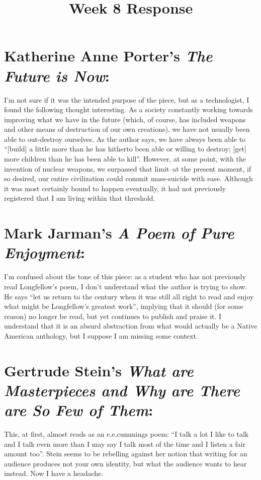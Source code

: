 \documentclass[letterpaper]{article}
\title{Week 8 Response}
\date{}
\begin{document}
	\maketitle
	\onehalfspacing
	\section{Katherine Anne Porter's \emph{The Future is Now}:}
	I'm not sure if it was the intended purpose of the piece, but as a technologist, I found the following thought interesting. As a society constantly working towards improving what we have in the future (which, of course, has included weapons and other means of destruction of our own creations), we have not usually been able to out-destroy ourselves. As the author says, we have always been able to ``[build] a little more than he has hitherto been able or willing to destroy; [get] more children than he has been able to kill''. However, at some point, with the invention of nuclear weapons, we surpassed that limit--at the present moment, if so desired, our entire civilization could commit mass-suicide with ease. Although it was most certainly bound to happen eventually, it had not previously registered that I am living within that threshold.

	\section{Mark Jarman's \emph{A Poem of Pure Enjoyment}:}
	I'm confused about the tone of this piece: as a student who has not previously read Longfellow's poem, I don't understand what the author is trying to show. He says ``let us return to the century when it was still all right to read and enjoy what might be Longfellow's greatest work'', implying that it should (for some reason) no longer be read, but yet continues to publish and praise it. I understand that it is an absurd abstraction from what would actually be a Native American anthology, but I suppose I am missing some context.

	\section{Gertrude Stein's \emph{What are Masterpieces and Why are There are So Few of Them}:}
	This, at first, almost reads as an e.e.cummings poem: ``I talk a lot I like to talk and I talk even more than I may say I talk most of the time and I listen a fair amount too''. Stein seems to be rebelling against her notion that writing for an audience produces not your own identity, but what the audience wants to hear instead. Now I have a headache.

   
\end{document}
